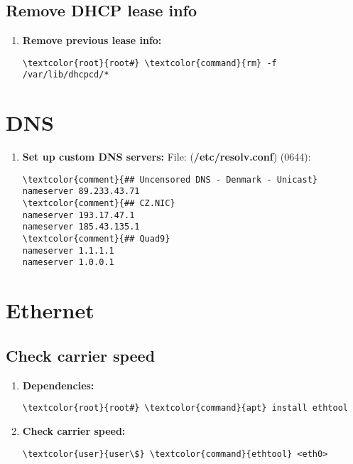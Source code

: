 \documentclass[10pt, a4paper, onecolumn, openany]{book} %
\begin{document}
\subsection{Remove DHCP lease info}
\begin{enumerate}
    \item \textbf{Remove previous lease info:}
\begin{Verbatim}[commandchars=\\\{\}]
\textcolor{root}{root#} \textcolor{command}{rm} -f /var/lib/dhcpcd/*
\end{Verbatim}
\end{enumerate}
\section{DNS}
\begin{enumerate}
    \item \textbf{Set up custom DNS servers:}
\newline File: (\textbf{\textcolor{file}{/etc/resolv.conf}}) (0644):
\begin{Verbatim}[commandchars=\\\{\}]
\textcolor{comment}{## Uncensored DNS - Denmark - Unicast}
nameserver 89.233.43.71
\textcolor{comment}{## CZ.NIC}
nameserver 193.17.47.1
nameserver 185.43.135.1
\textcolor{comment}{## Quad9}
nameserver 1.1.1.1
nameserver 1.0.0.1
\end{Verbatim}
\end{enumerate}
\section{Ethernet}
\subsection{Check carrier speed}
\begin{enumerate}
    \item \textbf{Dependencies:}
\begin{Verbatim}[commandchars=\\\{\}]
\textcolor{root}{root#} \textcolor{command}{apt} install ethtool
\end{Verbatim}
    \item \textbf{Check carrier speed:}
\begin{Verbatim}[commandchars=\\\{\}]
\textcolor{user}{user\$} \textcolor{command}{ethtool} <eth0>
\end{Verbatim}
\end{enumerate}
\end{document}
